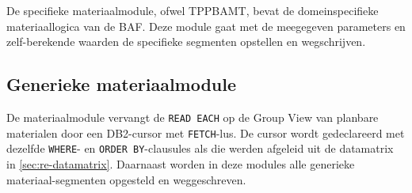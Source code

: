 De specifieke materiaalmodule, ofwel TPPBAMT, bevat de domeinspecifieke materiaallogica van de BAF. Deze module gaat met de meegegeven parameters en zelf-berekende waarden de specifieke segmenten opstellen en wegschrijven.

\subsection{Generieke materiaalmodule}
\label{subsec:poc-materiaal}

De materiaalmodule vervangt de \texttt{READ EACH} op de Group View van planbare materialen door een
DB2-cursor met \texttt{FETCH}-lus. De cursor wordt gedeclareerd met dezelfde \texttt{WHERE}- en
\texttt{ORDER BY}-clausules als die werden afgeleid uit de datamatrix in \autoref{sec:re-datamatrix}. Daarnaast worden in deze modules alle generieke materiaal-segmenten opgesteld en weggeschreven.

\begin{center}
    \label{lst:poc-cursor}
\end{center}

